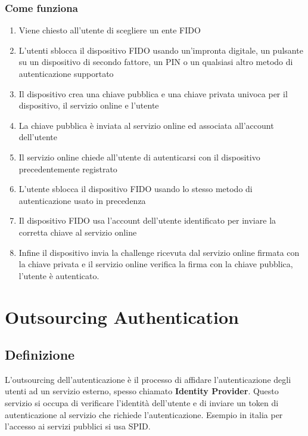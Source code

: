         \subsubsection{Come funziona}
            \begin{enumerate}
                \item Viene chiesto all'utente di scegliere un ente FIDO
                \item L'utenti sblocca il dispositivo FIDO usando un'impronta digitale, un pulsante su un dispositivo di secondo fattore, un PIN o un qualsiasi altro metodo di autenticazione supportato
                \item Il dispositivo crea una chiave pubblica e una chiave privata univoca per il dispositivo, il servizio online e l'utente
                \item La chiave pubblica è inviata al servizio online ed associata all'account dell'utente
                \item Il servizio online chiede all'utente di autenticarsi con il dispositivo precedentemente registrato
                \item L'utente sblocca il dispositivo FIDO usando lo stesso metodo di autenticazione usato in precedenza
                \item Il dispositivo FIDO usa l'account dell'utente identificato per inviare la corretta chiave al servizio online
                \item Infine il dispositivo invia la challenge ricevuta dal servizio online firmata con la chiave privata e il servizio online verifica la firma con la chiave pubblica, l'utente è autenticato.
            \end{enumerate}
\section{Outsourcing Authentication}
    \subsection{Definizione}
        L'outsourcing dell'autenticazione è il processo di affidare l'autenticazione degli utenti ad un servizio esterno, spesso chiamato \textbf{Identity Provider}. Questo servizio si occupa di verificare l'identità dell'utente e di inviare un token di autenticazione al servizio che richiede l'autenticazione. Esempio in italia per l'accesso ai servizi pubblici si usa SPID.

